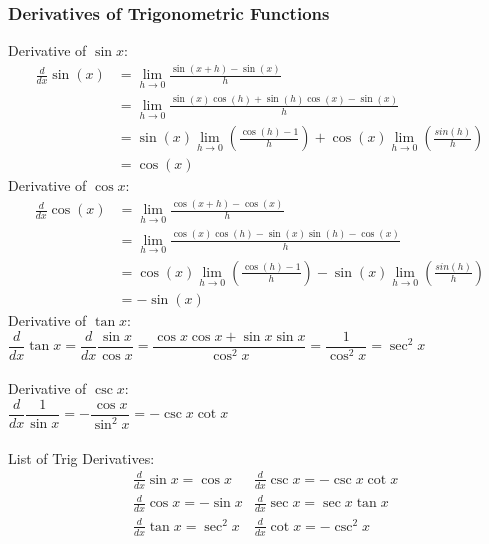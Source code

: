 \documentclass[11pt, fleqn]{article}
\begin{document}
\subsubsection{Derivatives of Trigonometric Functions}
Derivative of $\sin x$:
\begin{align*}
    \frac{d}{dx}\sin (x)&=\lim_{h\to 0}\frac{\sin(x+h)-\sin (x)}{h}\\
    &=\lim_{h\to 0}\frac{\sin(x)\cos(h)+\sin(h)\cos(x)-\sin(x)}{h}\\
    &=\sin(x)\lim_{h\to 0}\left(\frac{\cos(h)-1}{h}\right)+\cos(x)\lim_{h\to 0}\left(\frac{sin(h)}{h}\right)\\
    &=\cos(x)
\end{align*}
Derivative of $\cos x$:
\begin{align*}
    \frac{d}{dx}\cos(x)&=\lim_{h\to 0}\frac{\cos(x+h)-\cos(x)}{h}\\
    &=\lim_{h\to 0}\frac{\cos(x)\cos(h)-\sin(x)\sin(h)-\cos(x)}{h}\\
    &=\cos(x)\lim_{h\to 0}\left(\frac{\cos(h)-1}{h}\right)-\sin(x)\lim_{h\to 0}\left(\frac{sin(h)}{h}\right)\\
    &=-\sin(x)
\end{align*}
Derivative of $\tan x$:\\
$\dfrac{d}{dx}\tan x=\dfrac{d}{dx}\dfrac{\sin x}{\cos x}=\dfrac{\cos x\cos x+\sin x\sin x}{\cos^2x}=\dfrac{1}{\cos^2x}=\sec^2x$\\
\\
Derivative of $\csc x$:\\
$\dfrac{d}{dx}\dfrac{1}{\sin x}=-\dfrac{\cos x}{\sin^2 x}=-\csc x\cot x$\\
\\
List of Trig Derivatives:\\
\begin{align*}
    &\frac{d}{dx}\sin x=\cos x &\frac{d}{dx}\csc x = -\csc x\cot x\\
    &\frac{d}{dx}\cos x=-\sin x &\frac{d}{dx}\sec x=\sec x\tan x\\
    &\frac{d}{dx}\tan x =\sec^2 x &\frac{d}{dx}\cot x=-\csc^2 x
\end{align*}
\end{document}
